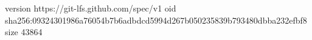 version https://git-lfs.github.com/spec/v1
oid sha256:09324301986a76054b7b6adbdcd5994d267b050235839b793480dbba232efbf8
size 43864
